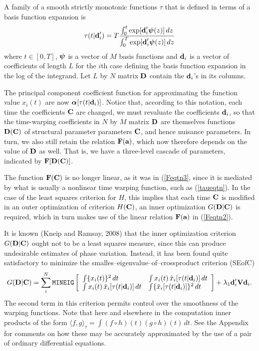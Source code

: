 \documentclass[12pt]{article}
\begin{document}
A family of a smooth strictly monotonic functions $\tau$ that is defined in terms of a basis function expansion is
\begin{equation} \label{taueqtn}
  \tau(t|\mbox{\bf d}_i') = T \frac{\int_0^t \exp[\mbox{\bf d}_i' \mbox{\boldmath${\psi}$}(z)] \, dz }{ \int_0^T \exp[\mbox{\bf d}_i' \mbox{\boldmath${\psi}$}(z)] \, dz}
\end{equation}
where $t \in [0,T]$, $\mbox{\boldmath${\psi}$}$ is a vector of $M$ basis functions and $\mbox{\bf d}_i$ is a vector of coefficients of length $L$ for the $i$th case defining the basis function expansion in the log of the integrand.  Let $L$ by $N$ matrix $\mbox{\bf D}$ contain the $\mbox{\bf d}_i$'s in its columns.

The principal component coefficient function for approximating the function value $x_i(t)$ are now $\mbox{\boldmath${\alpha}$}[\tau(t|\mbox{\bf d}_i)]$.  Notice that,  according to this notation, each time the coefficients $\mbox{\bf C}$ are changed, we must revaluate the coefficients $\mbox{\bf d}_i$, so that the time-warping coefficients in $N$ by $M$ matrix $\mbox{\bf D}$ are themselves functions $\mbox{\bf D}(\mbox{\bf C})$ of structural parameter parameters $\mbox{\bf C}$, and hence nuisance parameters.  In turn, we also still retain the relation $\mbox{\bf F}(\mbox{\bf a})$, which now therefore depends on the value of $\mbox{\bf D}$ as well.  That is, we have a three-level cascade of parameters, indicated by $\mbox{\bf F}[\mbox{\bf D}(\mbox{\bf C})]$.

The function $\mbox{\bf F}(\mbox{\bf C})$ is no longer linear, as it was in (\ref{Feqtn3}, since it is mediated by what is usually a nonlinear time warping function, such as (\ref{taueqtn}).  In the case of the least squares criterion for $H$, this implies that each time $\mbox{\bf C}$ is modified in an outer optimization of criterion $H(\mbox{\bf C})$, an inner optimization $G(\mbox{\bf D}|\mbox{\bf C})$ is required, which in turn makes use of the linear relation $\mbox{\bf F}(\mbox{\bf a})$ in (\ref{Feqtn2}).

It is known (Kneip and Ramsay, 2008) that the inner optimization criterion $G(\mbox{\bf D}|\mbox{\bf C})$ ought not to be a least squares measure, since this can produce undesirable estimates of phase variation.  Instead, it has been found quite satisfactory to minimize the smalles--eigenvalue--of--crossproduct criterion (SEofC)
\begin{equation} \label{crossprodmatrix}
    G(\mbox{\bf D}|\mbox{\bf C}) = \sum_i^N \mbox{\tt MINEIG}
  \left[
     \begin{array}{ll}
       \int \{x_i(t)\}^2                          \, dt &
       \int x_i(t) \, \hat{x}_i[\tau(t|\mbox{\bf d}_i)]   \, dt \\
       \int x_i(t) \, \hat{x}_i[\tau(t|\mbox{\bf d}_i)]   \, dt &
       \int \{\hat{x}_i[\tau(t|\mbox{\bf d}_i)]\}^2       \, dt
     \end{array}
   \right] + \lambda_1 \mbox{\bf d}_i' \mbox{\bf V} \mbox{\bf d}_i.
\end{equation}
The second term in this criterion permits control over the smoothness of the warping functions.  Note that here and elsewhere in the computation inner products of the form $\langle f,g \rangle_\tau = \int (f \circ h)(t) (g \circ h)(t) \, dt.$  See the Appendix for comments on how these may be accurately approximated by the use of a pair of ordinary differential equations.
\end{document}
